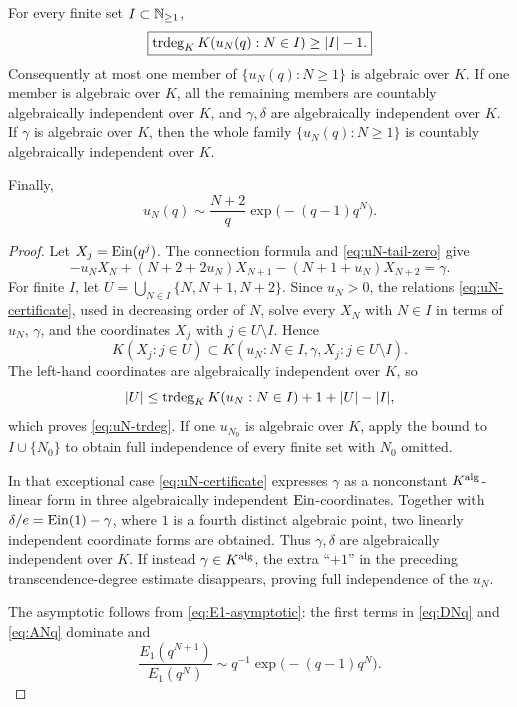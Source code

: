 \begin{theorem}
\label{thm:uN-defect}
For every finite set \(I\subset\mathbb N_{\ge1}\),
\begin{equation}\label{eq:uN-trdeg}
 \boxed{\displaystyle
 \operatorname{trdeg}_K K(u_N(q):N\in I)\ge |I|-1.}
\end{equation}
Consequently at most one member of \(\{u_N(q):N\ge1\}\) is algebraic over
\(K\).  If one member is algebraic over \(K\), all the remaining members are
countably algebraically independent over \(K\), and \(\gamma,\delta\) are
algebraically independent over \(K\).  If \(\gamma\) is algebraic over
\(K\), then the whole family \(\{u_N(q):N\ge1\}\) is countably
algebraically independent over \(K\).

Finally,
\begin{equation}\label{eq:uN-asymptotic}
 u_N(q)\sim\frac{N+2}{q}
 \exp\!\bigl(-(q-1)q^N\bigr).
\end{equation}
\end{theorem}

\begin{proof}
Let \(X_j=\operatorname{Ein}(q^j)\).  The connection formula and
\eqref{eq:uN-tail-zero} give
\begin{equation}\label{eq:uN-certificate}
 -u_NX_N+(N+2+2u_N)X_{N+1}
 -(N+1+u_N)X_{N+2}=\gamma.
\end{equation}
For finite \(I\), let
\(U=\bigcup_{N\in I}\{N,N+1,N+2\}\).  Since \(u_N>0\), the relations
\eqref{eq:uN-certificate}, used in decreasing order of \(N\), solve every
\(X_N\) with \(N\in I\) in terms of \(u_N\), \(\gamma\), and the
coordinates \(X_j\) with \(j\in U\setminus I\).  Hence
\[
 K(X_j:j\in U)
 \subset
 K(u_N:N\in I,\gamma,X_j:j\in U\setminus I).
\]
The left-hand coordinates are algebraically independent over \(K\), so
\[
 |U|\le
 \operatorname{trdeg}_KK(u_N:N\in I)+1+|U|-|I|,
\]
which proves \eqref{eq:uN-trdeg}.  If one \(u_{N_0}\) is algebraic over
\(K\), apply the bound to \(I\cup\{N_0\}\) to obtain full independence of
every finite set with \(N_0\) omitted.

In that exceptional case \eqref{eq:uN-certificate} expresses \(\gamma\) as
a nonconstant \(K^{\rm alg}\)-linear form in three algebraically independent
\(\operatorname{Ein}\)-coordinates.  Together with
\(\delta/e=\operatorname{Ein}(1)-\gamma\), where \(1\) is a fourth distinct algebraic
point, two linearly independent coordinate forms are obtained.  Thus
\(\gamma,\delta\) are algebraically independent over \(K\).  If instead
\(\gamma\in K^{\rm alg}\), the extra ``\(+1\)'' in the preceding
transcendence-degree estimate disappears, proving full independence of the
\(u_N\).

The asymptotic follows from \eqref{eq:E1-asymptotic}: the first terms in
\eqref{eq:DNq} and \eqref{eq:ANq} dominate and
\[
 \frac{E_1(q^{N+1})}{E_1(q^N)}
 \sim q^{-1}\exp\!\bigl(-(q-1)q^N\bigr).
\]
\end{proof}

